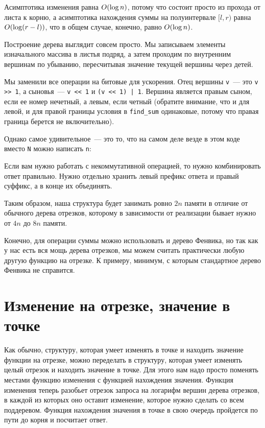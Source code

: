 Асимптотика изменения равна $O(\log n)$, потому что состоит просто из прохода от листа к корню, а асимптотика нахождения суммы на полуинтервале $[l, r)$ равна $O(\log (r - l))$, что в общем случае, конечно, равно $O(\log n)$.

Построение дерева выглядит совсем просто. Мы записываем элементы изначального массива в листья подряд, а затем проходим по внутренним вершинам по убыванию, пересчитывая значение текущей вершины через детей.



Мы заменили все операции на битовые для ускорения. Отец вершины \verb+v+~--- это \verb+v >> 1+, а сыновья~--- \verb+v << 1+ и \verb+(v << 1) | 1+. Вершина является правым сыном, если ее номер нечетный, а левым, если четный (обратите внимание, что и для левой, и для правой границы условия в \verb+find_sum+ одинаковые, потому что правая граница берется не включительно).

Однако самое удивительное~--- это то, что на самом деле везде в этом коде вместо \verb+N+ можно написать \verb+n+:



\begin{observation}
    Если вам нужно работать с некоммутативной операцией, то нужно комбинировать ответ правильно. Нужно отдельно хранить левый префикс ответа и правый суффикс, а в конце их объединять.
\end{observation}

Таким образом, наша структура будет занимать ровно $2n$ памяти в отличие от обычного дерева отрезков, которому в зависимости от реализации бывает нужно от $4n$ до $8n$ памяти.

Конечно, для операции суммы можно использовать и дерево Фенвика, но так как у нас есть вся мощь дерева отрезков, мы можем считать практически любую другую функцию на отрезке. К примеру, минимум, с которым стандартное дерево Фенвика не справится.

\section{Изменение на отрезке, значение в точке}

Как обычно, структуру, которая умеет изменять в точке и находить значение функции на отрезке, можно переделать в структуру, которая умеет изменять целый отрезок и находить значение в точке. Для этого нам надо просто поменять местами функцию изменения с функцией нахождения значения. Функция изменения теперь разобьет отрезок запроса на логарифм вершин дерева отрезков, в каждой из которых оно оставит изменение, которое нужно сделать со всем поддеревом. Функция нахождения значения в точке в свою очередь пройдется по пути до корня и посчитает ответ.

